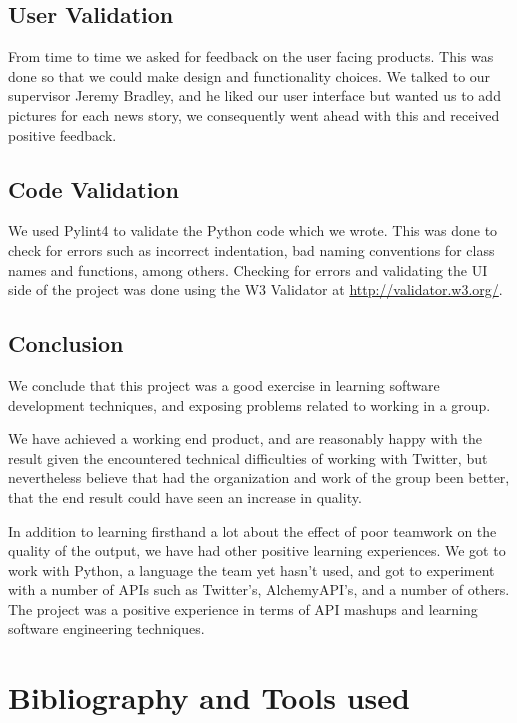 \documentclass{report}
\begin{document}
	\section{User Validation}
	
	From time to time we asked for feedback on the user facing products. This was done so that we could make design and functionality choices. We talked to our supervisor Jeremy Bradley, and he liked our user interface but wanted us to add pictures for each news story, we consequently went ahead with this and received positive feedback.
	
	\section{Code Validation}
	
	We used Pylint4 to validate the Python code which we wrote. This was done to check for errors such as incorrect indentation, bad naming conventions for class names and functions, among others. Checking for errors and validating the UI side of the project was done using the W3 Validator at \url{http://validator.w3.org/}.
	
	\section{Conclusion}
	
		We conclude that this project was a good exercise in learning software development techniques, and exposing problems related to working in a group.
		
		We have achieved a working end product, and are reasonably happy with the result given the encountered technical difficulties of working with Twitter, but nevertheless believe that had the organization and work of the group been better, that the end result could have seen an increase in quality.
	
		In addition to learning firsthand a lot about the effect of poor teamwork on the quality of the output, we have had other positive learning experiences. We got to work with Python, a language the team yet hasn't used, and got to experiment with a number of APIs such as Twitter's, AlchemyAPI's, and a number of others. The project was a positive experience in terms of API mashups and learning software engineering techniques.
	
	\chapter{Bibliography and Tools used}\label{chap:bib}
	
\end{document}

